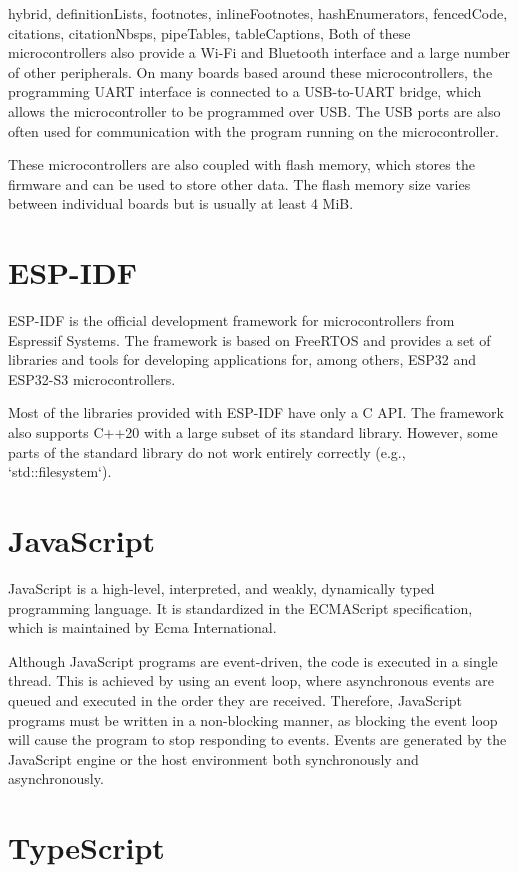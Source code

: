 \begin{markdown*}{%
  hybrid,
  definitionLists,
  footnotes,
  inlineFootnotes,
  hashEnumerators,
  fencedCode,
  citations,
  citationNbsps,
  pipeTables,
  tableCaptions,
}
Both of these microcontrollers also provide a Wi-Fi and Bluetooth interface and a large number of other peripherals. On many boards based around these microcontrollers, the programming UART interface is connected to a USB-to-UART bridge, which allows the microcontroller to be programmed over USB. The USB ports are also often used for communication with the program running on the microcontroller.

These microcontrollers are also coupled with flash memory, which stores the firmware and can be used to store other data. The flash memory size varies between individual boards but is usually at least 4 MiB.

\section{ESP-IDF}

ESP-IDF is the official development framework for microcontrollers from Espressif Systems. The framework is based on FreeRTOS and provides a set of libraries and tools for developing applications for, among others, ESP32 and ESP32-S3 microcontrollers.

Most of the libraries provided with ESP-IDF have only a C API. The framework also supports C++20 with a large subset of its standard library. However, some parts of the standard library do not work entirely correctly (e.g., `std::filesystem`).

\section{JavaScript}

JavaScript is a high-level, interpreted, and weakly, dynamically typed programming language. It is standardized in the ECMAScript specification, which is maintained by Ecma International.

Although JavaScript programs are event-driven, the code is executed in a single thread. This is achieved by using an event loop, where asynchronous events are queued and executed in the order they are received. Therefore, JavaScript programs must be written in a non-blocking manner, as blocking the event loop will cause the program to stop responding to events. Events are generated by the JavaScript engine or the host environment both synchronously and asynchronously.

\section{TypeScript}


\end{markdown*}
